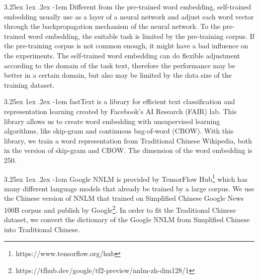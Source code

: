 \documentclass[12pt]{article}
\makeatletter
\newcounter{subsubsubsection}[subsubsection]
\renewcommand\paragraph{\@startsection{paragraph}{5}{\z@}%
  {3.25ex \@plus1ex \@minus.2ex}%
  {-1em}%
  {\normalfont\normalsize\bfseries}}
\makeatother
\begin{document}
\begin{CJK*}{UTF8}{bkai}
\begin{spacing}{1.77}
\paragraph{}
Different from the pre-trained word embedding, self-trained embedding usually use as a layer of a neural network and adjust each word vector through the backpropagation mechanism of the neural network. To the pre-trained word embedding, the suitable task is limited by the pre-training corpus. If the pre-training corpus is not common enough, it might have a bad influence on the experiments. The self-trained word embedding can do flexible adjustment according to the domain of the task text, therefore the performance may be better in a certain domain, but also may be limited by the data size of the training dataset.

\paragraph{}
fastText \cite{bojanowski2016enriching} is a library for efficient text classification and representation learning created by Facebook's AI Research (FAIR) lab. This library allows us to create word embedding with unsupervised learning algorithms, like skip-gram and continuous bag-of-word (CBOW). With this library, we train a word representation from Traditional Chinese Wikipedia, both in the version of skip-gram and CBOW. The dimension of the word embedding is 250.

\paragraph{}
Google NNLM is provided by TensorFlow Hub\footnote{https://www.tensorflow.org/hub} which has many different language models that already be trained by a large corpus. We use the Chinese version of NNLM that trained on Simplified Chinese Google News 100B corpus and publish by Google\footnote{https://tfhub.dev/google/tf2-preview/nnlm-zh-dim128/1}. In order to fit the Traditional Chinese dataset, we convert the dictionary of the Google NNLM from Simplified Chinese into Traditional Chinese.


\end{spacing}
\end{CJK*}
\end{document}
